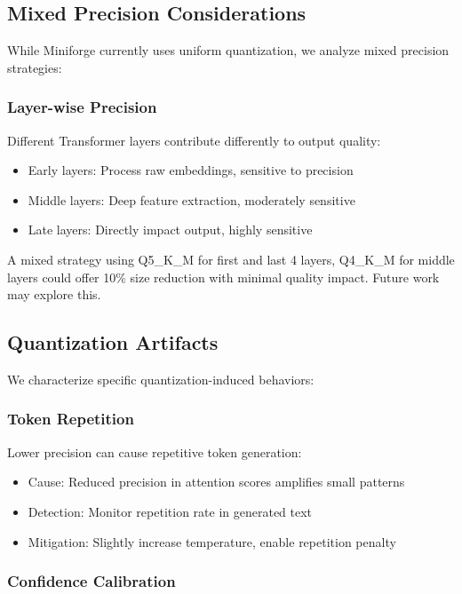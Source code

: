 \subsection{Mixed Precision Considerations}

While Miniforge currently uses uniform quantization, we analyze mixed precision strategies:

\subsubsection{Layer-wise Precision}

Different Transformer layers contribute differently to output quality:

\begin{itemize}
    \item Early layers: Process raw embeddings, sensitive to precision
    \item Middle layers: Deep feature extraction, moderately sensitive
    \item Late layers: Directly impact output, highly sensitive
\end{itemize}

A mixed strategy using Q5\_K\_M for first and last 4 layers, Q4\_K\_M for middle layers could offer 10\% size reduction with minimal quality impact. Future work may explore this.

\subsection{Quantization Artifacts}

We characterize specific quantization-induced behaviors:

\subsubsection{Token Repetition}

Lower precision can cause repetitive token generation:

\begin{itemize}
    \item Cause: Reduced precision in attention scores amplifies small patterns
    \item Detection: Monitor repetition rate in generated text
    \item Mitigation: Slightly increase temperature, enable repetition penalty
\end{itemize}

\subsubsection{Confidence Calibration}

